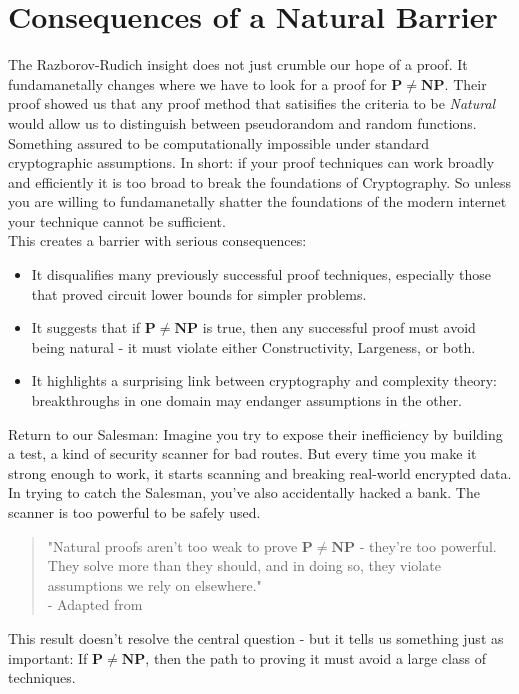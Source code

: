 \documentclass[12pt]{report}
\begin{document}
\section{Consequences of a Natural Barrier}
The Razborov-Rudich insight does not just crumble our hope of a proof.
It fundamanetally changes where we have to look for a proof for $\mathbf{P \ne NP}$.
Their proof showed us that any proof method that satisifies the criteria to be \textit{Natural} would allow us to distinguish between pseudorandom and random functions.
Something assured to be computationally impossible under standard cryptographic assumptions.
In short: if your proof techniques can work broadly and efficiently it is too broad to break the foundations of Cryptography.
So unless you are willing to fundamanetally shatter the foundations of the modern internet your technique cannot be sufficient.\\
This creates a barrier with serious consequences:
\begin{itemize}
    \item It disqualifies many previously successful proof techniques, especially those that proved circuit lower bounds for simpler problems.
    \item It suggests that if $\mathbf{P \ne NP}$ is true, then any successful proof must avoid being natural - it must violate either Constructivity, Largeness, or both.
    \item It highlights a surprising link between cryptography and complexity theory: breakthroughs in one domain may endanger assumptions in the other.
\end{itemize}
Return to our Salesman:
Imagine you try to expose their inefficiency by building a test, a kind of security scanner for bad routes.
But every time you make it strong enough to work, it starts scanning and breaking real-world encrypted data.
In trying to catch the Salesman, you've also accidentally hacked a bank.
The scanner is too powerful to be safely used.

\begin{quote}
    "Natural proofs aren't too weak to prove $\mathbf{P \ne NP}$ - they're too powerful.
    They solve more than they should, and in doing so, they violate assumptions we rely on elsewhere."\\
    - Adapted from \cite{razborov1994}
\end{quote}

This result doesn't resolve the central question - but it tells us something just as important:
If $\mathbf{P \ne NP}$, then the path to proving it must avoid a large class of techniques.
\vspace{3cm}
\end{document}
